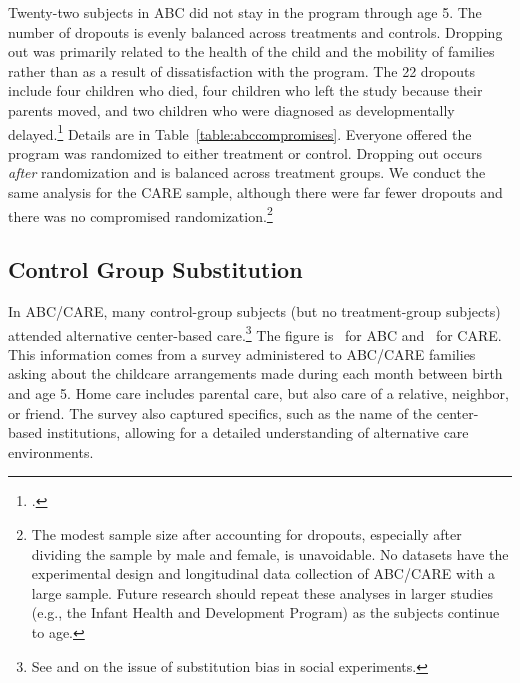 Twenty-two subjects in ABC did not stay in the program through age 5. The number of dropouts is evenly balanced across treatments and controls. Dropping out was primarily related to the health of the child and the mobility of families rather than as a result of  dissatisfaction with the program. The 22 dropouts include four children who died, four children who left the study because their parents moved, and two children who were diagnosed as developmentally delayed.\footnote{\citet{Burchinal_Campbell_etal_1997_CD}.} Details are in Table~\ref{table:abccompromises}. Everyone offered the program was randomized to either treatment or control. Dropping out occurs \emph{after} randomization and is balanced across treatment groups. We conduct the same analysis for the CARE sample, although there were far fewer dropouts and there was no compromised randomization.\footnote{The modest sample size after accounting for dropouts, especially after dividing the sample by male and female, is unavoidable. No datasets have the experimental design and longitudinal data collection of ABC/CARE with a large sample. Future research should repeat these analyses in larger studies (e.g., the Infant Health and Development Program) as the subjects continue to age.}

\subsection{Control Group Substitution}

In ABC/CARE, many control-group subjects (but no treatment-group subjects) attended alternative center-based care.\footnote{See \cite{Heckman_Hohmann_etal_2000_QJE} and \citet{Kline_Walters_2016_QJE} on the issue of substitution bias in social experiments.} The figure is \treatsubsabc\ for ABC and \treatsubscarec\ for CARE. This information comes from a survey administered to ABC/CARE families asking about the childcare arrangements made during each month between birth and age 5. Home care includes parental care, but also care of a relative, neighbor, or friend. The survey also captured specifics, such as the name of the center-based institutions, allowing for a detailed understanding of alternative care environments.

